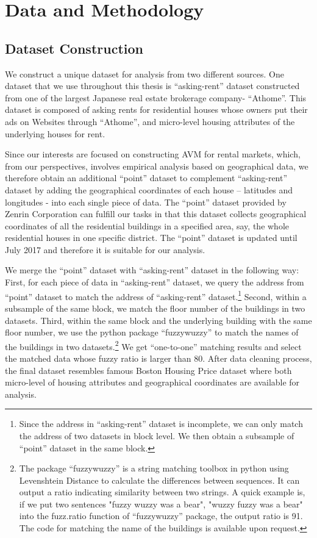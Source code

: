 \documentclass[a4paper, 12pt]{article} %
\begin{document}
\section{Data and Methodology}
\subsection{Dataset Construction}
We construct a unique dataset for analysis from two different sources. One dataset that we use throughout this thesis is “asking-rent” dataset constructed from one of the largest Japanese real estate brokerage company- “Athome”. This dataset is composed of asking rents for residential houses whose owners put their ads on Websites through “Athome”, and micro-level housing attributes of the underlying houses for rent. 

Since our interests are focused on constructing AVM for rental markets, which, from our perspectives, involves empirical analysis based on geographical data, we therefore obtain an additional “point” dataset to complement “asking-rent” dataset by adding the geographical coordinates of each house – latitudes and longitudes - into each single piece of data. The “point” dataset provided by Zenrin Corporation can fulfill our tasks in that this dataset collects geographical coordinates of all the residential buildings in a specified area, say, the whole residential houses in one specific district. The “point” dataset is updated until July 2017 and therefore it is suitable for our analysis. 

We merge the “point” dataset with “asking-rent” dataset in the following way: First, for each piece of data in “asking-rent” dataset, we query the address from “point” dataset to match the address of “asking-rent” dataset.\footnote{Since the address in “asking-rent” dataset is incomplete, we can only match the address of two datasets in block level. We then obtain a subsample of “point” dataset in the same block.   } Second, within a subsample of the same block, we match the floor number of the buildings in two datasets. Third, within the same block and the underlying building with the same floor number, we use the python package “fuzzywuzzy” to match the names of the buildings in two datasets.\footnote{The package “fuzzywuzzy” is a string matching toolbox in python using Levenshtein Distance to calculate the differences between sequences. It can output a ratio indicating similarity between two strings. A quick example is, if we put two sentences "fuzzy wuzzy was a bear", "wuzzy fuzzy was a bear" into the fuzz.ratio function of “fuzzywuzzy” package, the output ratio is 91. The code for matching the name of the buildings is available upon request.} We get “one-to-one” matching results and select the matched data whose fuzzy ratio is larger than 80. After data cleaning process, the final dataset resembles famous Boston Housing Price dataset \citep{harrison1978hedonic} where both micro-level of housing attributes and geographical coordinates are available for analysis.
\end{document}
